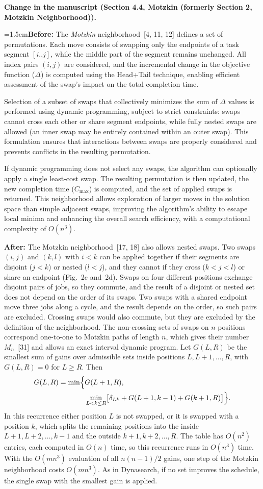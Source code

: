 \documentclass[12pt]{article}
\newcommand{\change}[3]{\par\smallskip\noindent\textbf{Change in the manuscript (#1).}\par
  {\leftskip=1.5em\noindent\textbf{Before:} #2\par\noindent\textbf{After:} #3\par}}
\begin{document}
\change{Section 4.4, Motzkin (formerly Section 2, Motzkin Neighborhood)}{The \emph{Motzkin} neighborhood~[4, 11, 12] defines a set of permutations. Each move consists of swapping only the endpoints of a task segment $[i..j]$, while the middle part of the segment remains unchanged. All index pairs $(i,j)$ are considered, and the incremental change in the objective function ($\Delta$) is computed using the Head+Tail technique, enabling efficient assessment of the swap's impact on the total completion time.

Selection of a subset of swaps that collectively minimizes the sum of $\Delta$ values is performed using dynamic programming, subject to strict constraints: swaps cannot cross each other or share segment endpoints, while fully nested swaps are allowed (an inner swap may be entirely contained within an outer swap). This formulation ensures that interactions between swaps are properly considered and prevents conflicts in the resulting permutation.

If dynamic programming does not select any swaps, the algorithm can optionally apply a single least-cost swap. The resulting permutation is then updated, the new completion time ($C_{\max}$) is computed, and the set of applied swaps is returned. This neighborhood allows exploration of larger moves in the solution space than simple adjacent swaps, improving the algorithm's ability to escape local minima and enhancing the overall search efficiency, with a computational complexity of $O(n^3)$.}{The Motzkin neighborhood~[17, 18] also allows nested swaps. Two swaps $(i,j)$ and $(k,l)$ with $i<k$ can be applied together if their segments are disjoint ($j<k$) or nested ($l<j$), and they cannot if they cross ($k<j<l$) or share an endpoint (Fig.~2c and~2d). Swaps on four different positions exchange disjoint pairs of jobs, so they commute, and the result of a disjoint or nested set does not depend on the order of its swaps. Two swaps with a shared endpoint move three jobs along a cycle, and the result depends on the order, so such pairs are excluded. Crossing swaps would also commute, but they are excluded by the definition of the neighborhood. The non-crossing sets of swaps on $n$ positions correspond one-to-one to Motzkin paths of length $n$, which gives their number $M_n$~[31] and allows an exact interval dynamic program. Let $G(L,R)$ be the smallest sum of gains over admissible sets inside positions $L,L+1,\dots,R$, with $G(L,R)=0$ for $L\ge R$. Then
\begin{equation}
\begin{aligned}
G(L,R)=\min\Bigl\{&G(L+1,R),\\
&\min_{L<k\le R}\bigl[\delta_{Lk}+G(L+1,k-1)+G(k+1,R)\bigr]\Bigr\}.
\end{aligned}
\end{equation}
In this recurrence either position $L$ is not swapped, or it is swapped with a position $k$, which splits the remaining positions into the inside $L+1,L+2,\dots,k-1$ and the outside $k+1,k+2,\dots,R$. The table has $O(n^2)$ entries, each computed in $O(n)$ time, so this recurrence runs in $O(n^3)$ time. With the $O(mn^3)$ evaluation of all $n(n-1)/2$ gains, one step of the Motzkin neighborhood costs $O(mn^3)$. As in Dynasearch, if no set improves the schedule, the single swap with the smallest gain is applied.}
\end{document}
